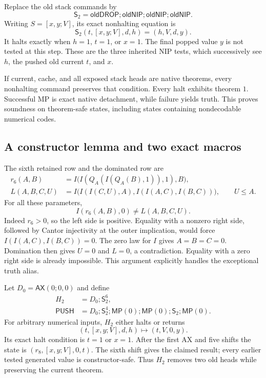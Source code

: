 Replace the old stack commands by
\[
 \mathsf S_2=\mathsf{oldDROP};\mathsf{oldNIP};
              \mathsf{oldNIP};\mathsf{oldNIP}.
\]
Writing $S=[x,y;V]$, its exact nonhalting equation is
\begin{equation}
 \mathsf S_2(t,[x,y;V],d,h)=(h,V,d,y).
 \label{eq:stride2-command}
\end{equation}
It halts exactly when $h=1$, $t=1$, or $x=1$. The final popped value $y$
is not tested at this step. These are the three inherited NIP tests,
which successively see $h$, the pushed old current $t$, and $x$.

If current, cache, and all exposed stack heads are native theorems,
every nonhalting command preserves that condition. Every halt exhibits
theorem $1$. Successful MP is exact native detachment, while failure
yields truth. This proves soundness on theorem-safe states, including
states containing nondecodable numerical codes.

\subsection{A constructor lemma and two exact macros}

The sixth retained row and the dominated row are
\begin{align*}
 r_6(A,B)&=I\bigl(I(Q_A(I(Q_A(B),1)),1),B\bigr),\\
 L(A,B,C,U)&=I\bigl(I(I(C,U),A),I(I(A,C),I(B,C))\bigr),
 \qquad U\leq A.
\end{align*}
For all these parameters,
\begin{equation}
 I(r_6(A,B),0)\ne L(A,B,C,U).
 \label{eq:stride2-nondetach}
\end{equation}
Indeed $r_6>0$, so the left side is positive. Equality with a nonzero
right side, followed by Cantor injectivity at the outer implication,
would force $I(I(A,C),I(B,C))=0$. The zero law for $I$ gives
$A=B=C=0$. Domination then gives $U=0$ and $L=0$, a contradiction.
Equality with a zero right side is already impossible. This argument
explicitly handles the exceptional truth alias.

Let $D_0=\mathsf{AX}(0;0,0)$ and define
\begin{align*}
 H_2&=D_0;\mathsf S_2^6,\\
 \mathsf{PUSH}&=D_0;\mathsf S_2^4;
       \mathsf{MP}(0);\mathsf{MP}(0);\mathsf S_2;\mathsf{MP}(0).
\end{align*}
For arbitrary numerical inputs, $H_2$ either halts or returns
\[
 (t,[x,y;V],d,h)\longmapsto(t,V,0,y).
\]
Its exact halt condition is $t=1$ or $x=1$. After the first AX and five
shifts the state is $(r_8,[x,y;V],0,t)$. The sixth shift gives the claimed
result; every earlier tested generated value is constructor-safe. Thus
$H_2$ removes two old heads while preserving the current theorem.


